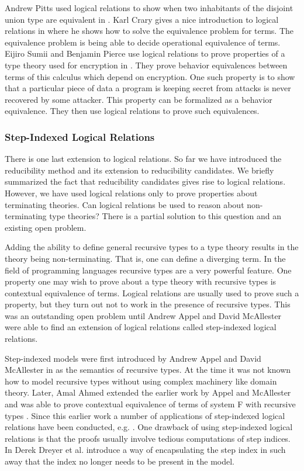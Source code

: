 Andrew Pitts used logical relations to show when two inhabitants of
the disjoint union type are equivalent in \cite{Pitts:1998}.  Karl
Crary gives a nice introduction to logical relations in
\cite{Pierce:2004} where he shows how to solve the equivalence problem
for terms.  The equivalence problem is being able to decide
operational equivalence of terms.  Eijiro Sumii and Benjamin Pierce
use logical relations to prove properties of a type theory used for
encryption in \cite{Sumii:2003}.  They prove behavior equivalences
between terms of this calculus which depend on encryption.  One such
property is to show that a particular piece of data a program is
keeping secret from attacks is never recovered by some attacker.  This
property can be formalized as a behavior equivalence.  They then use
logical relations to prove such equivalences.

\subsubsection{Step-Indexed Logical Relations}
\label{subsec:step_indexed_logical_relations}
There is one last extension to logical relations.  So far we have
introduced the reducibility method and its extension to reducibility
candidates.  We briefly summarized the fact that reducibility
candidates gives rise to logical relations.  However, we have used
logical relations only to prove properties about terminating theories.
Can logical relations be used to reason about non-terminating type
theories?  There is a partial solution to this question and an
existing open problem. 

Adding the ability to define general recursive types to a type theory
results in the theory being non-terminating.  That is, one can define a
diverging term.  In the field of programming languages recursive
types are a very powerful feature.  One property one may wish to prove
about a type theory with recursive types is contextual equivalence of
terms.  Logical relations are usually used to prove such a property,
but they turn out not to work in the presence of recursive types.
This was an outstanding open problem until Andrew Appel and David
McAllester were able to find an extension of logical relations called
step-indexed logical relations.

Step-indexed models were first introduced by Andrew Appel and David
McAllester in \cite{Appel:2001} as the semantics of recursive types.
At the time it was not known how to model recursive types without
using complex machinery like domain theory.  Later, Amal Ahmed
extended the earlier work by Appel and McAllester and was able to
prove contextual equivalence of terms of system F with recursive types
\cite{Ahmed:2006}.  Since this earlier work a number of applications
of step-indexed logical relations have been conducted, e.g.
\cite{Acar:2008,Ahmed:2009,Neis:2009,Vytiniotis:2009}.  One drawback
of using step-indexed logical relations is that the proofs usually
involve tedious computations of step indices.  In \cite{Dreyer:2010}
Derek Dreyer et al. introduce a way of encapsulating the step index in
such away that the index no longer needs to be present in the model.

